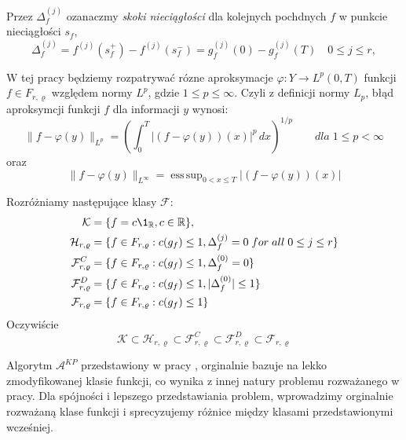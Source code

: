 \documentclass[oik, pdftex, robocza, man]{mgrwms}
\DeclareMathOperator*{\esssup}{ess\,sup}
\begin{document}
    Przez $\Delta_f^{(j)}$ ozanaczmy \emph{skoki nieciągłości} dla kolejnych pochdnych $f$ w punkcie nieciągłości $s_f$,
    \begin{equation*}
        \Delta_f^{(j)} = f^{(j)}(s_f^+) - f^{(j)}(s_f^-) = g_f^{(j)}(0) - g_f^{(j)}(T) \quad 0 \leq j \leq r,
    \end{equation*}

    W tej pracy będziemy rozpatrywać rózne aproksymacje $\varphi : Y \rightarrow L^p(0, T)$ funkcji $f \in F_{r, \varrho}$ względem normy $L^p$, gdzie $1 \leq p \leq \infty$. Czyli z definicji normy $L_{p}$, błąd aproksymcji funkcji $f$ dla informacji $y$ wynosi:
    \begin{equation*}
        \|f-\varphi(y)\|_{L^p} = \left( \int_{0}^{T} |(f-\varphi(y))(x)|^p \,dx  \right)^{1/p} \qquad dla \; 1 \leq p < \infty
    \end{equation*}
    oraz
    \begin{equation*}
        \|f-\varphi(y)\|_{L^\infty} = \esssup_{0 < x \leq T} | (f - \varphi(y))(x) |
    \end{equation*}

    Rozróżniamy następujące klasy $\mathcal{F}$:
    \begin{equation*}
        \begin{split}
            \mathcal{K} & = \{f = c \1_{\R}, c \in \R \}, \\
            \mathcal{H}_{r, \varrho} & = \{ f \in F_{r, \varrho}: c(g_{f}) \leq 1, \Delta_{f}^{(j)} = 0 \; for\; all\; 0 \leq j \leq r\} \\
            \mathcal{F}_{r, \varrho}^{C} & = \{ f \in F_{r, \varrho}: c(g_{f}) \leq 1, \Delta_{f}^{(0)} = 0 \} \\
            \mathcal{F}_{r, \varrho}^{D} & = \{ f \in F_{r, \varrho}: c(g_{f}) \leq 1, | \Delta_{f}^{(0)} | \leq 1 \} \\
            \mathcal{F}_{r, \varrho} & = \{ f \in F_{r, \varrho}: c(g_{f}) \leq 1 \} \\
        \end{split}
    \end{equation*}
    Oczywiście
    \begin{equation*}
        \mathcal{K} \subset \mathcal{H}_{r, \varrho} \subset \mathcal{F}_{r, \varrho}^{C} \subset \mathcal{F}_{r, \varrho}^{D} \subset \mathcal{F}_{r, \varrho}
    \end{equation*}


    Algorytm $\mathcal{A}^{KP}$ przedstawiony w pracy \cite{CoDF}, orginalnie bazuje na lekko zmodyfikowanej klasie funkcji, co wynika z innej natury problemu rozważanego w pracy. Dla spójności i lepszego przedstawiania problem, wprowadzimy orginalnie rozważaną klase funkcji i sprecyzujemy różnice między klasami przedstawionymi wcześniej. 
\end{document}

